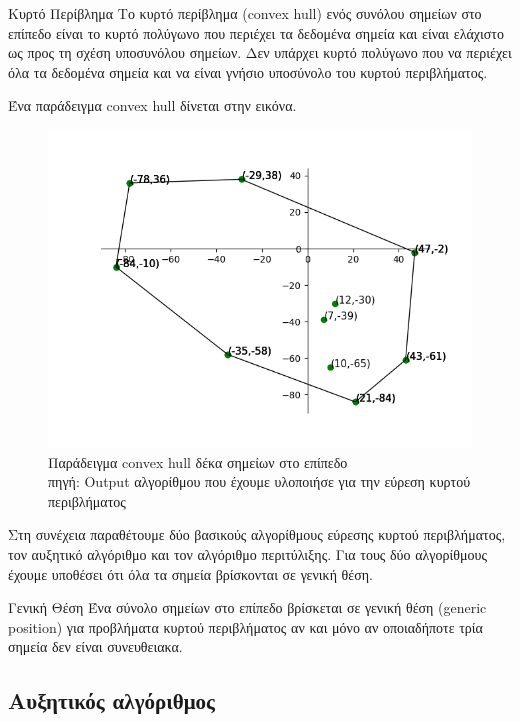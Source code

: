 \documentclass[oneside,12pt]{book}
\newenvironment{matlab}
	{\begin{figure}[hp]\centering\captionsetup{justification=centering}}
	{\end{figure}}
\theoremstyle{definition}
\begin{document}
\begin{mydefinition}{Κυρτό Περίβλημα}{}
	Το κυρτό περίβλημα (convex hull) ενός συνόλου σημείων στο επίπεδο είναι το κυρτό πολύγωνο που περιέχει τα δεδομένα σημεία και είναι ελάχιστο ως προς τη σχέση υποσυνόλου σημείων. Δεν υπάρχει κυρτό πολύγωνο που να περιέχει όλα τα δεδομένα σημεία και να είναι γνήσιο υποσύνολο του κυρτού περιβλήματος.
\end{mydefinition}

Ένα παράδειγμα convex hull δίνεται στην εικόνα. \\

\begin{matlab}
	\includegraphics[scale=0.8]{images/convexhull.png}
	\caption{Παράδειγμα convex hull δέκα σημείων στο επίπεδο \\ πηγή: Output αλγορίθμου που έχουμε υλοποιήσε για την εύρεση κυρτού περιβλήματος}
\end{matlab}

Στη συνέχεια παραθέτουμε δύο βασικούς αλγορίθμους εύρεσης κυρτού περιβλήματος, τον αυξητικό αλγόριθμο και τον αλγόριθμο περιτύλιξης. Για τους δύο αλγορίθμους έχουμε υποθέσει ότι όλα τα σημεία βρίσκονται σε γενική θέση.

\begin{mydefinition}{Γενική Θέση}{}
	Ένα σύνολο σημείων στο επίπεδο βρίσκεται σε γενική θέση (generic position) για προβλήματα κυρτού περιβλήματος αν και μόνο αν οποιαδήποτε τρία σημεία δεν είναι συνευθειακα.
\end{mydefinition}

\subsection{Αυξητικός αλγόριθμος}
\end{document}
